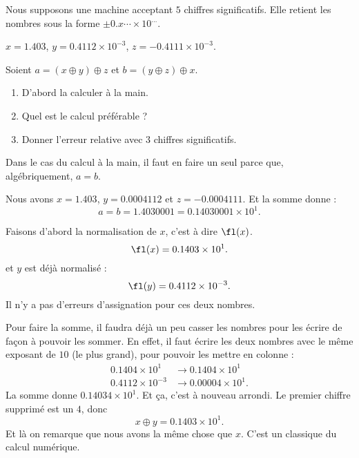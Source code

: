 \begin{example}
    
    Nous supposons une machine acceptant \( 5\) chiffres significatifs. Elle retient les nombres sous la forme \( \pm 0.x\cdots\times 10^{\ldots}\).
    
    \( x=1.403\), \( y=0.4112\times 10^{-3}\), \( z=-0.4111\times 10^{-3}\). 

    Soient
            \( a=(x\oplus y)\oplus z\) et  \( b=(y\oplus z)\oplus x\).

    \begin{enumerate}
        \item
     D'abord la calculer à la main. 
        \item
     Quel est le calcul préférable ?
 \item
     Donner l'erreur relative avec \( 3\) chiffres significatifs.
    \end{enumerate}

Dans le cas du calcul à la main, il faut en faire un seul parce que, algébriquement, \( a=b\).

Nous avons \( x=1.403\), \( y=0.0004112\) et \( z=-0.0004111\). Et la somme donne :
\begin{equation}
    a=b=1.4030001=0.14030001\times 10^1.
\end{equation}

Faisons d'abord la normalisation de \( x\), c'est à dire \( \fl(x)\).
\begin{equation}
    \fl(x)=0.1403\times 10^1.
\end{equation}
et \( y\) est déjà normalisé :
\begin{equation}
    \fl(y)=0.4112\times 10^{-3}.
\end{equation}
Il n'y a pas d'erreurs d'assignation pour ces deux nombres. 

Pour faire la somme, il faudra déjà un peu casser les nombres pour les écrire de façon à pouvoir les sommer. En effet, il faut écrire les deux nombres avec le même exposant de \( 10\) (le plus grand), pour pouvoir les mettre en colonne :
\begin{subequations}
    \begin{align}
        0.1404\times 10^1&\to 0.1404\times 10^1\\
        0.4112\times 10^{-3}&\to 0.00004\times 10^1.
    \end{align}
\end{subequations}
La somme donne \( 0.14034\times 10 ^1\). Et ça, c'est à nouveau arrondi. Le premier chiffre supprimé est un \( 4\), donc 
\begin{equation}
    x\oplus y=0.1403\times 10^1.
\end{equation}
Et là on remarque que nous avons la même chose que \( x\). C'est un classique du calcul numérique.


\end{example}
